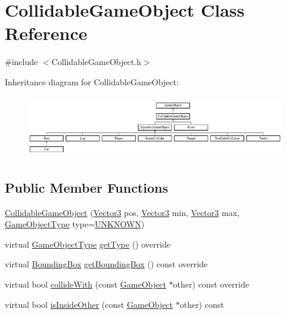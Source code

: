\hypertarget{class_collidable_game_object}{}\section{Collidable\+Game\+Object Class Reference}
\label{class_collidable_game_object}


{\ttfamily \#include $<$Collidable\+Game\+Object.\+h$>$}

Inheritance diagram for Collidable\+Game\+Object\+:\begin{figure}[H]
\begin{center}
\leavevmode
\includegraphics[height=2.758621cm]{class_collidable_game_object}
\end{center}
\end{figure}
\subsection*{Public Member Functions}
\begin{DoxyCompactItemize}
\item 
\hyperlink{class_collidable_game_object_af19a7e3e12239a38cbc076eeafcafff6}{Collidable\+Game\+Object} (\hyperlink{class_vector3}{Vector3} pos, \hyperlink{class_vector3}{Vector3} min, \hyperlink{class_vector3}{Vector3} max, \hyperlink{_game_object_8h_a57678b60d65afb213d04a6b090c64a08}{Game\+Object\+Type} type=\hyperlink{_game_object_8h_a57678b60d65afb213d04a6b090c64a08a6ce26a62afab55d7606ad4e92428b30c}{U\+N\+K\+N\+O\+WN})
\item 
virtual \hyperlink{_game_object_8h_a57678b60d65afb213d04a6b090c64a08}{Game\+Object\+Type} \hyperlink{class_collidable_game_object_a9890003d579d6318a4da31a0d540ab2f}{get\+Type} () override
\item 
virtual \hyperlink{class_bounding_box}{Bounding\+Box} \hyperlink{class_collidable_game_object_a7998e4aabd23263212e72f6a40d42036}{get\+Bounding\+Box} () const override
\item 
virtual bool \hyperlink{class_collidable_game_object_aabc837db5ee83847ad55a5f95cb106a6}{collide\+With} (const \hyperlink{class_game_object}{Game\+Object} $\ast$other) const override
\item 
virtual bool \hyperlink{class_collidable_game_object_ae972d5d27b0f9bb54e9d20f9e6c205b6}{is\+Inside\+Other} (const \hyperlink{class_game_object}{Game\+Object} $\ast$other) const
\end{DoxyCompactItemize}
